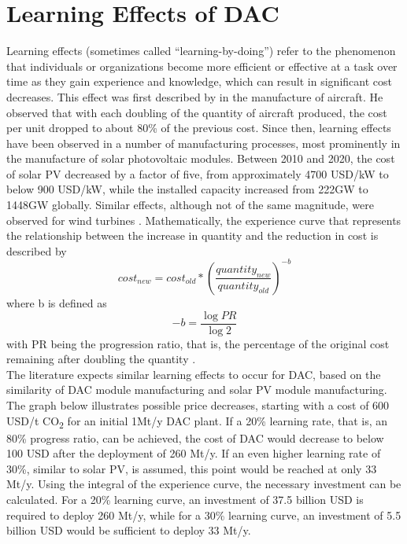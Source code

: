 \chapter{Learning Effects of DAC}
Learning effects (sometimes called “learning-by-doing”) refer to the phenomenon that individuals or organizations become more efficient or effective at a task over time as they gain experience and knowledge, which can result in significant cost decreases.
This effect was first described by \textcite{Wright1936FactorsAirplanes} in the manufacture of aircraft. He observed that with each doubling of the quantity of aircraft produced, the cost per unit dropped to about 80\% of the previous cost. Since then, learning effects have been observed in a number of manufacturing processes, most prominently in the manufacture of solar photovoltaic modules. Between 2010 and 2020, the cost of solar PV decreased by a factor of five, from approximately 4700 USD/kW to below 900 USD/kW, while the installed capacity increased from 222GW to 1448GW globally. Similar effects, although not of the same magnitude, were observed for wind turbines \parencite{Shrestha2022LearningDeployment}. Mathematically, the experience curve that represents the relationship between the increase in quantity and the reduction in cost is described by \begin{equation} {cost_{new} = cost_{old}*\left( \frac{quantity_{new}}{quantity_{old}} \right)^{-b}} \end{equation} where b is defined as \begin{equation} -b = \frac{\log{PR}}{\log{2}} \end{equation} with PR being the progression ratio, that is, the percentage of the original cost remaining after doubling the quantity \parencite{Fasihi2019Techno-economicPlants}.\\
The literature expects similar learning effects to occur for DAC, based on the similarity of DAC module manufacturing and solar PV module manufacturing. The graph below illustrates possible price decreases, starting with a cost of 600 USD/t CO\textsubscript{2} for an initial 1Mt/y DAC plant. If a 20\% learning rate, that is, an 80\% progress ratio, can be achieved, the cost of DAC would decrease to below 100 USD after the deployment of 260 Mt/y. If an even higher learning rate of 30\%, similar to solar PV, is assumed, this point would be reached at only 33 Mt/y. Using the integral of the experience curve, the necessary investment can be calculated. For a 20\% learning curve, an investment of 37.5 billion USD is required to deploy 260 Mt/y, while for a 30\% learning curve, an investment of 5.5 billion USD would be sufficient to deploy 33 Mt/y.

